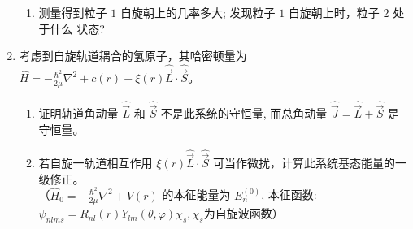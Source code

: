 \begin{enumerate}
\begin{enumerate}
\item 
测量得到粒子 $ 1 $ 自旋朝上的几率多大; 发现粒子 $ 1 $ 自旋朝上时，粒子 $ 2 $ 处于什么 状态?


	
	
\end{enumerate}


\banswer{
	
}

\item 
考虑到自旋轨道耦合的氢原子，其哈密顿量为 $\hat{H}=-\frac{\hbar^{2}}{2 \mu} \nabla^{2}+c(r)+\xi(r) \hat{\vec{L}} \cdot \hat{\vec{S}}$。
\begin{enumerate}
	\item
	证明轨道角动量 $\hat{\vec{L}}$ 和 $\hat{\vec{S}}$ 不是此系统的守恒量, 而总角动量 $\hat{\vec{J}}=\hat{\vec{L}}+\hat{\vec{S}}$ 是守恒量。
	\item
	若自旋一轨道相互作用 $\xi(r) \hat{\vec{L}} \cdot \hat{\vec{S}}$ 可当作微扰，计算此系统基态能量的一级修正。 \\
	（$\hat{H}_{0}=-\frac{\hbar^{2}}{2 \mu} \nabla^{2}+V(r)$ 的本征能量为 $E_{n}^{(0)}$, 本征函数: $\psi_{n l m s}=R_{n l}(r) Y_{l m}(\theta, \varphi) \chi_{s}, \chi_{s}$为自旋波函数）
	
	
	
\end{enumerate}

\banswer{
	
}






\end{enumerate}

